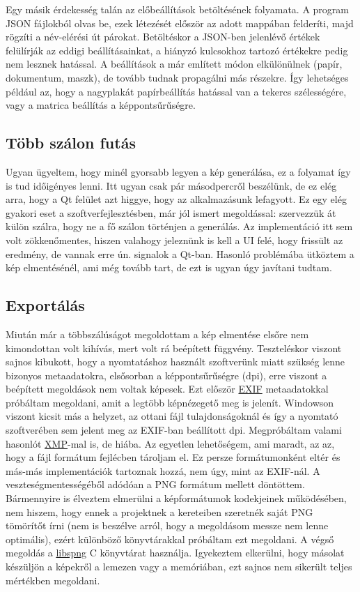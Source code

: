 Egy másik érdekesség talán az előbeállítások betöltésének folyamata. A program JSON fájlokból olvas be, ezek létezését először az adott mappában felderíti, majd rögzíti a név-elérési út párokat. Betöltéskor a JSON-ben jelenlévő értékek felülírják az eddigi beállításainkat, a hiányzó kulcsokhoz tartozó értékekre pedig nem lesznek hatással. A beállítások a már említett módon elkülönülnek (papír, dokumentum, maszk), de tovább tudnak propagálni más részekre. Így lehetséges például az, hogy a nagyplakát papírbeállítás hatással van a tekercs szélességére, vagy a matrica beállítás a képpontsűrűségre. 

\subsection{Több szálon futás}

Ugyan ügyeltem, hogy minél gyorsabb legyen a kép generálása, ez a folyamat így is tud időigényes lenni. Itt ugyan csak pár másodpercről beszélünk, de ez elég arra, hogy a Qt felület azt higgye, hogy az alkalmazásunk lefagyott. Ez egy elég gyakori eset a szoftverfejlesztésben, már jól ismert megoldással: szervezzük át külön szálra, hogy ne a fő szálon történjen a generálás. Az implementáció itt sem volt zökkenőmentes, hiszen valahogy jeleznünk is kell a UI felé, hogy frissült az eredmény, de vannak erre ún. signalok a Qt-ban. Hasonló problémába ütköztem a kép elmentésénél, ami még tovább tart, de ezt is ugyan úgy javítani tudtam. 

\subsection{Exportálás}

Miután már a többszálúságot megoldottam a kép elmentése elsőre nem kimondottan volt kihívás, mert volt rá beépített függvény. Teszteléskor viszont sajnos kibukott, hogy a nyomtatáshoz használt szoftverünk miatt szükség lenne bizonyos metaadatokra, elsősorban a képpontsűrűségre (dpi), erre viszont a beépített megoldások nem voltak képesek. Ezt először \href{https://en.wikipedia.org/wiki/Exif}{EXIF} metaadatokkal próbáltam megoldani, amit a legtöbb képnézegető meg is jelenít. Windowson viszont kicsit más a helyzet, az ottani fájl tulajdonságoknál és így a nyomtató szoftverében sem jelent meg az EXIF-ban beállított dpi. Megpróbáltam valami hasonlót \href{https://en.wikipedia.org/wiki/Extensible_Metadata_Platform}{XMP}-mal is, de hiába. Az egyetlen lehetőségem, ami maradt, az az, hogy a fájl formátum fejlécben tároljam el. Ez persze formátumonként eltér és más-más implementációk tartoznak hozzá, nem úgy, mint az EXIF-nál. A veszteségmentességéből adódóan a PNG formátum mellett döntöttem. Bármennyire is élveztem elmerülni a képformátumok kodekjeinek működésében, nem hiszem, hogy ennek a projektnek a kereteiben szeretnék saját PNG tömörítőt írni (nem is beszélve arról, hogy a megoldásom messze nem lenne optimális), ezért különböző könyvtárakkal próbáltam ezt megoldani. A végső megoldás a \href{https://libspng.org/}{libspng} C könyvtárat használja. Igyekeztem elkerülni, hogy másolat készüljön a képekről a lemezen vagy a memóriában, ezt sajnos nem sikerült teljes mértékben megoldani. 

